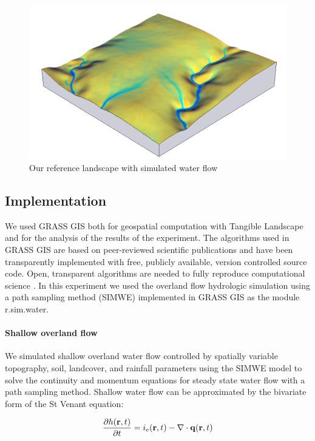 \documentclass{isprs}
\begin{document}
\begin{figure}[ht!]
\begin{center}
\includegraphics[width=1.0\columnwidth]{figures/depth.png}
\caption{Our reference landscape with simulated water flow}
\label{fig:study_area}
\end{center}
\end{figure}

\subsection{Implementation}
We used GRASS GIS both
for geospatial computation with Tangible Landscape
and for the analysis of the results of the experiment.
The algorithms used in GRASS GIS are 
based on peer-reviewed scientific publications 
and have been 
transparently implemented 
with free, publicly available, version controlled source code. 
Open, transparent algorithms are needed to fully reproduce computational science \cite{Rocchini2012}. 
In this experiment we used
the overland flow hydrologic simulation using a path sampling method (SIMWE) 
implemented in GRASS GIS as the module r.sim.water.

\paragraph{Shallow overland flow}
We simulated shallow overland water flow controlled by spatially variable topography, soil, landcover, and rainfall parameters using the SIMWE model to solve the continuity and momentum equations for steady state water flow with a path sampling method. 
%
Shallow water flow can be approximated by
the bivariate form of the St Venant equation:

\begin{equation}
\label{eq:water}
{\partial h({\bf r},t) \over \partial t} =
 i_e({\bf r},t) - \nabla \cdot {\bf q}({\bf r},t)
\end{equation}
\end{document}
